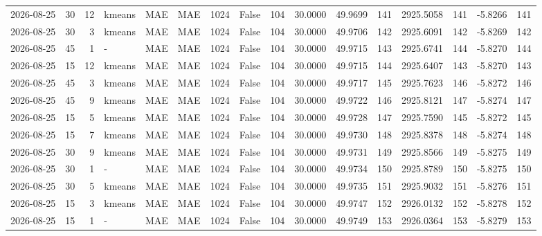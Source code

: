 \documentclass[10pt]{article}
\begin{document}
\begin{landscape}
\begin{longtable}{@{}lrrlllrcrrrrrrrr@{}}
2026-08-25 & 30 & 12 & kmeans & MAE & MAE & 1024 & False & 104 & 30.0000 & 49.9699 & 141 & 2925.5058 & 141 & -5.8266 & 141 \\
2026-08-25 & 30 & 3 & kmeans & MAE & MAE & 1024 & False & 104 & 30.0000 & 49.9706 & 142 & 2925.6091 & 142 & -5.8269 & 142 \\
2026-08-25 & 45 & 1 & - & MAE & MAE & 1024 & False & 104 & 30.0000 & 49.9715 & 143 & 2925.6741 & 144 & -5.8270 & 144 \\
2026-08-25 & 15 & 12 & kmeans & MAE & MAE & 1024 & False & 104 & 30.0000 & 49.9715 & 144 & 2925.6407 & 143 & -5.8270 & 143 \\
2026-08-25 & 45 & 3 & kmeans & MAE & MAE & 1024 & False & 104 & 30.0000 & 49.9717 & 145 & 2925.7623 & 146 & -5.8272 & 146 \\
2026-08-25 & 45 & 9 & kmeans & MAE & MAE & 1024 & False & 104 & 30.0000 & 49.9722 & 146 & 2925.8121 & 147 & -5.8274 & 147 \\
2026-08-25 & 15 & 5 & kmeans & MAE & MAE & 1024 & False & 104 & 30.0000 & 49.9728 & 147 & 2925.7590 & 145 & -5.8272 & 145 \\
2026-08-25 & 15 & 7 & kmeans & MAE & MAE & 1024 & False & 104 & 30.0000 & 49.9730 & 148 & 2925.8378 & 148 & -5.8274 & 148 \\
2026-08-25 & 30 & 9 & kmeans & MAE & MAE & 1024 & False & 104 & 30.0000 & 49.9731 & 149 & 2925.8566 & 149 & -5.8275 & 149 \\
2026-08-25 & 30 & 1 & - & MAE & MAE & 1024 & False & 104 & 30.0000 & 49.9734 & 150 & 2925.8789 & 150 & -5.8275 & 150 \\
2026-08-25 & 30 & 5 & kmeans & MAE & MAE & 1024 & False & 104 & 30.0000 & 49.9735 & 151 & 2925.9032 & 151 & -5.8276 & 151 \\
2026-08-25 & 15 & 3 & kmeans & MAE & MAE & 1024 & False & 104 & 30.0000 & 49.9747 & 152 & 2926.0132 & 152 & -5.8278 & 152 \\
2026-08-25 & 15 & 1 & - & MAE & MAE & 1024 & False & 104 & 30.0000 & 49.9749 & 153 & 2926.0364 & 153 & -5.8279 & 153 \\
\bottomrule
\end{longtable}
\clearpage

\end{landscape}
\end{document}
